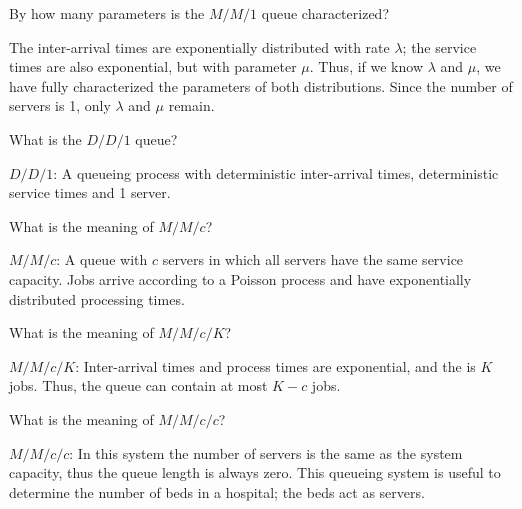 \begin{exercise}
  By how many parameters is the $M/M/1$ queue characterized?
  \begin{solution}
    The inter-arrival times are exponentially distributed with rate $\lambda$; the service times are also exponential, but with parameter $\mu$. Thus, if we know $\lambda$ and $\mu$, we have fully characterized the parameters of both distributions. Since the number of servers is 1, only $\lambda$ and $\mu$ remain.
  \end{solution}
\end{exercise}

\begin{exercise}
What is the $D/D/1$ queue?  
\begin{solution}
$D/D/1$: A queueing process with deterministic inter-arrival times, deterministic service times and 1 server.
\end{solution}
\end{exercise}

\begin{exercise}
  What is the meaning of $M/M/c$?
  \begin{solution}
$M/M/c$: A  queue with $c$ servers in which
  all servers have the same service capacity. Jobs arrive according to a
  Poisson process and have exponentially distributed processing times.
  \end{solution}
\end{exercise}

\begin{exercise}
  What is the meaning of $M/M/c/K$?
  \begin{solution}
$M/M/c/K$: Inter-arrival times and process times are exponential,
  and the  is $K$ jobs. Thus, the queue can
  contain at most $K-c$ jobs. 

  \end{solution}
\end{exercise}


\begin{exercise}
  What is the meaning of $M/M/c/c$?
  \begin{solution}
 $M/M/c/c$: In this system the number of servers is the same as
  the system capacity, thus the queue length is always zero. This
  queueing system is useful to determine the number of beds
  in a hospital; the beds act as servers.
  \end{solution}
\end{exercise}

